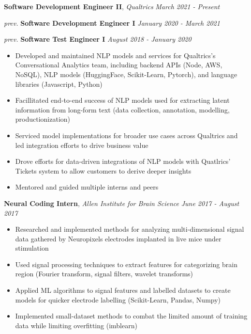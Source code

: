 \documentclass[9pt]{article}
\newenvironment{changemargin}[2]{%
  \begin{list}{}{%
    \setlength{\topsep}{0pt}%
    \setlength{\leftmargin}{#1}%
    \setlength{\rightmargin}{#2}%
    \setlength{\listparindent}{\parindent}%
    \setlength{\itemindent}{\parindent}%
    \setlength{\parsep}{\parskip}%
  }%
  \item[]}{\end{list}
}
\newcommand{\jobdescription}[1]{
	\begin{changemargin}{0.15in}{0.15in}
    \smallskip
		{#1}
    \medskip
	\end{changemargin}
}
\newcommand{\jobtitle}[3]{
	\textbf{#1}, \emph{#2} \hfill \emph{#3}\\
}
\newcommand{\subjobtitle}[2] {
    \begin{changemargin}{0.125in}{0in}
        \emph{prev.} \textbf{#1} \hfill \emph{#2}\\
    \end{changemargin}
}
\newenvironment{body} {
	\vspace*{-16pt}
	\begin{changemargin}{-0.25in}{-0.5in}
  }	
	{\end{changemargin}
}
\begin{document}
\begin{body}
	\vspace{14pt}
	
	\jobtitle{Software Development Engineer II}{Qualtrics}{March 2021 - Present}
	\subjobtitle{Software Development Engineer I}{January 2020 - March 2021}
    \subjobtitle{Software Test Engineer I}{August 2018 - January 2020}
	\jobdescription{
		\begin{itemize} \itemsep -0pt  %
			\item Developed and maintained NLP models and services for Qualtrics's Conversational Analytics team, including backend APIs (Node, AWS, NoSQL), NLP models (HuggingFace, Scikit-Learn, Pytorch), and language libraries (Javascript, Python)
			\item Facillitated end-to-end success of NLP models used for extracting latent information from long-form text (data collection, annotation, modelling, productionization)
			\item Serviced model implementations for broader use cases across Qualtrics and led integration efforts to drive business value
			\item Drove efforts for data-driven integrations of NLP models with Quatlrics' Tickets system to allow customers to derive deeper insights
			\item Mentored and guided multiple interns and peers
		\end{itemize}
	}
	

	\jobtitle{Neural Coding Intern}{Allen Institute for Brain Science}{June 2017 - August 2017}
	\jobdescription{
		\begin{itemize} \itemsep -0pt  %
			\item Researched and implemented methods for analyzing multi-dimensional signal data gathered by Neuropixels electrodes implanted in live mice under stimulation
			\item Used signal processing techniques to extract features for categorizing brain region (Fourier transform, signal filters, wavelet transforms)
			\item Applied ML algorithms to signal features and labelled datasets to create models for quicker electrode labelling (Scikit-Learn, Pandas, Numpy)
			\item Implemented small-dataset methods to combat the limited amount of training data while limiting overfitting (imblearn)
		\end{itemize}
	}
	

\end{body}
\end{document}
